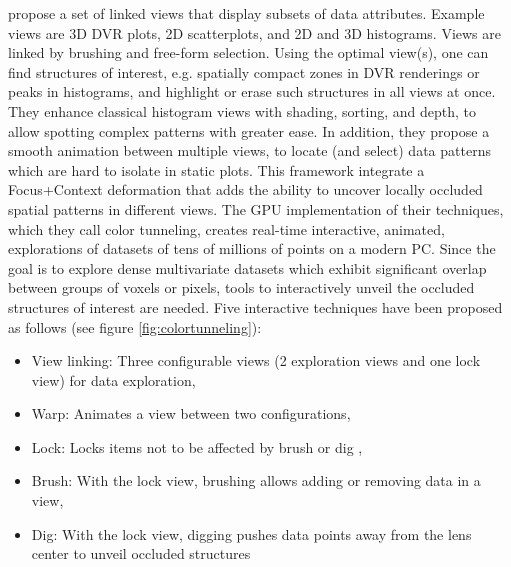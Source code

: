 \cite{6787171} propose a set of linked views that display
subsets of data attributes. Example views are 3D DVR plots, 2D
scatterplots, and 2D and 3D histograms. Views are linked by brushing
and free-form selection. Using the optimal view(s), one can find structures
of interest, e.g. spatially compact zones in DVR renderings or peaks in histograms, and highlight or erase such structures in all views
at once. They enhance classical histogram views with shading, sorting,
and depth, to allow spotting complex patterns with greater ease. In addition, they
propose a smooth animation between multiple views, to locate (and select)
data patterns which are hard to isolate in static plots. This framework integrate
a Focus+Context deformation that adds the ability to uncover locally occluded
spatial patterns in different views. The GPU implementation of their
techniques, which they call color tunneling, creates real-time interactive,
animated, explorations of datasets of tens of millions of points
on a modern PC. Since the goal is to explore dense multivariate datasets which exhibit significant
overlap between groups of voxels or pixels, tools to
interactively unveil the occluded structures of interest are needed.
Five interactive techniques have been proposed as follows (see figure \ref{fig:colortunneling}):
\begin{itemize}
\item View linking: Three configurable views (2 exploration views and
one lock view) for data exploration,
\item Warp: Animates a view between two configurations,
\item Lock: Locks items not to be affected by brush or dig ,
\item Brush: With the lock view, brushing allows adding or removing
data in a view,
\item Dig: With the lock view, digging pushes data points away from
the lens center to unveil occluded structures 

\end{itemize}


